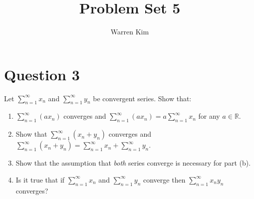 \documentclass[13pt]{article}
\title{Problem Set 5}
\author{Warren Kim}
\begin{document}
\maketitle

\newpage
\section*{Question 3}
Let $\sum_{n = 1}^{\infty} x_{n}$ and $\sum_{n = 1}^{\infty} y_{n}$ be convergent series. Show that:
\begin{enumerate}[label=(\alph*)]
\item $\sum_{n = 1}^{\infty} (ax_{n})$ converges and $\sum_{n =
    1}^{\infty} (ax_{n}) = a\sum_{n = 1}^{\infty} x_{n}$ for any $a
  \in \mathbb{R}$.

\item Show that $\sum_{n = 1}^{\infty} (x_{n} + y_{n})$ converges and
  $\sum_{n = 1}^{\infty} (x_{n} + y_{n}) = \sum_{n = 1}^{\infty} x_{n}
  + \sum_{n = 1}^{\infty} y_{n}$.

\item Show that the assumption that \textit{both} series converge is
  necessary for part (b).
  
\item Is it true that if $\sum_{n = 1}^{\infty} x_{n}$ and $\sum_{n =
    1}^{\infty} y_{n}$ converge then $\sum_{n = 1}^{\infty}
  x_{n}y_{n}$ converges?
\end{enumerate}
\end{document}
